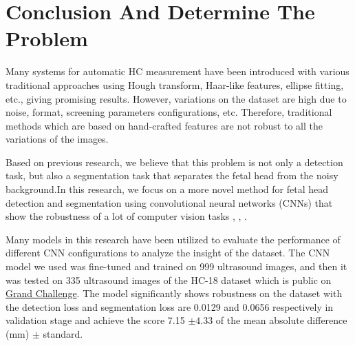 \section{Conclusion And Determine The Problem}
\label{section:determine_problem}
\noindent
	
	Many systems for automatic HC measurement have been introduced with various traditional approaches using Hough transform, Haar-like features, ellipse fitting, etc., giving promising results. However, variations on the dataset are high due to noise, format, screening parameters configurations, etc. Therefore, traditional methods which are based on hand-crafted features are not robust to all the variations of the images.
	
	Based on previous research, we believe that this problem is not only a detection task, but also a segmentation task that separates the fetal head from the noisy background.In this research, we focus on a more novel method for fetal head detection and segmentation using convolutional neural networks (CNNs) that show the robustness of a lot of computer vision tasks \cite{yamashita}, \cite{guidetocnn}, \cite{dlvstradition}. 
	
	Many models in this research have been utilized to evaluate the performance of different CNN configurations to analyze the insight of the dataset. The CNN model we used was fine-tuned and trained on 999 ultrasound images, and then it was tested on 335 ultrasound images of the HC-18 dataset which is public on \href{https://hc18.grand-challenge.org/}{Grand Challenge}. The model significantly shows robustness on the dataset with the detection loss and segmentation loss are 0.0129 and 0.0656 respectively in validation stage and achieve the score 7.15 $\pm 4.33$ of the mean absolute difference (mm) $\pm$ standard.

	
 
	
	

